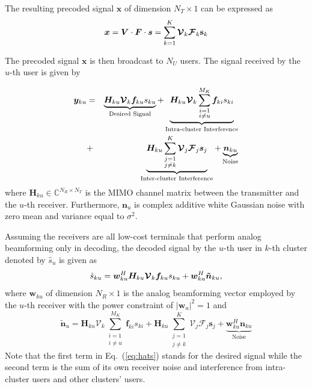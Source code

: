 \documentclass[conference]{IEEEtran}
\begin{document}
The resulting precoded signal $\bm x$ of dimension $N_T\times 1$  can be expressed as
\begin{equation}{\label{eq:transx}}
{\bm x} =  \bm{V}\cdot \bm{F}\cdot\bm{s} =\sum_{k=1}^K \bm{\mathcal{V}}_k \bm{\mathcal{F}}_k \mathbf{s}_k
\end{equation}

The precoded signal $\bm x$ is then broadcast to $N_U$ users. The signal received by the $u$-th user is given by

\begin{eqnarray}{\label{eq:rewrite}}
{\bm y}_{ku} &=&\underbrace{\bm{H}_{ku} \bm{\mathcal{V}}_k\bm{f}_{ku}{s}_{ku}}_\text{Desired Signal}+\underbrace{\bm{H}_{ku} \bm{\mathcal{V}}_k\sum_{\substack{i=1 \\ i\neq u}}^{M_K}\bm{f}_{ki}s_{ki}}_\text{Intra-cluster Interference} \nonumber\\
&+& \underbrace{\bm{H}_{ku}\sum_{\substack{j=1\\j\neq k}}^{K}\bm{\mathcal{V}}_j\bm{\mathcal{F}}_j\bm{s}_j}_\text{Inter-cluster Interference}+ \underbrace{\bm{n}_{ku}}_\text{Noise}
\end{eqnarray}
where $\bm{H}_{ku}$$\in\mathbb{C}^{N_R\times N_T}$ is the MIMO channel matrix between the transmitter and the $u$-th receiver\cite{el2014spatially}. Furthermore, $\bm{n}_u$ is complex additive white Gaussian noise with zero mean and variance equal to $\sigma^2$.

Assuming the receivers are all low-cost terminals that perform analog beamforming only in decoding, the decoded signal by the $u$-th user in $k$-th cluster denoted by $\hat{s}_u$ is given as
\begin{equation}{\label{eq:hats}}
\hat{s}_{ku} = \bm{w}_{ku}^H \bm{H}_{ku} \bm{\mathcal{V}}_k \bm{f}_{ku} s_{ku} + \bm{w}_{ku}^H \bm{\tilde{n}}_{ku},
\end{equation}
where ${\bm w}_{ku}$ of dimension $N_R\times 1$ is the analog beamforming vector employed by the $u$-th receiver with the power constraint of $|\bm{w}_u|^2=1$ and
\begin{equation}\label{Eq:ntilde}
\bm{\tilde{n}}_u=\bm{H}_{ku} \bm{\mathcal{V}}_k\sum_{\substack{i=1 \\ i\neq u}}^{M_K}\bm{f}_{ki}s_{ki} + \bm{H}_{ku}\sum_{\substack{j=1\\j\neq k}}^{K}\bm{\mathcal{V}}_j\bm{\mathcal{F}}_j\bm{s}_j+  \underbrace{\bm{w}_{ku}^H \bm{n}_{ku}}_\text{Noise}
\end{equation}
Note that the first term in Eq.~(\ref{eq:hats}) stands for the desired signal while the second term is the sum of its own receiver noise and interference from intra-cluster users and other clusters' users.
\end{document}
